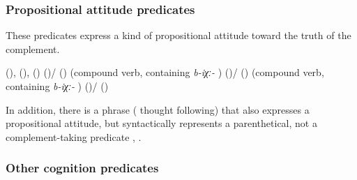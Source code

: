
\subsubsection{Propositional attitude predicates}
\label{sssec:Propositional attitude predicates}

These predicates express a kind of propositional attitude toward the truth of the complement.
%
\begin{exe}
	\ex	\label{ex:propositional attitude predicates}
	\begin{xlist}
		\ex	{} (),  (),  () 
		\ex	{} 
		\ex	{} ()\slash{} ()  (compound verb, containing \textit{b-iχː-} )
		\ex	{} ()\slash{} ()  (compound verb, containing \textit{b-iχː-} )
		\ex	{} ()\slash{} () 
	\end{xlist}
\end{exe}

In addition, there is a phrase  ( thought following)  that also expresses a propositional attitude, but syntactically represents a parenthetical, not a complement-taking predicate , .



\subsubsection{Other cognition predicates}
\label{sssec:Other cognition predicates}

